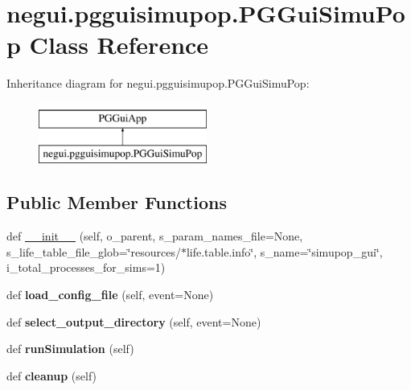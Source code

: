 \hypertarget{classnegui_1_1pgguisimupop_1_1PGGuiSimuPop}{}\section{negui.\+pgguisimupop.\+P\+G\+Gui\+Simu\+Pop Class Reference}
\label{classnegui_1_1pgguisimupop_1_1PGGuiSimuPop}
Inheritance diagram for negui.\+pgguisimupop.\+P\+G\+Gui\+Simu\+Pop\+:\begin{figure}[H]
\begin{center}
\leavevmode
\includegraphics[height=2.000000cm]{classnegui_1_1pgguisimupop_1_1PGGuiSimuPop}
\end{center}
\end{figure}
\subsection*{Public Member Functions}
\begin{DoxyCompactItemize}
\item 
def \hyperlink{classnegui_1_1pgguisimupop_1_1PGGuiSimuPop_aa159ead5d8fbd28d693c9021db12b95e}{\+\_\+\+\_\+init\+\_\+\+\_\+} (self, o\+\_\+parent, s\+\_\+param\+\_\+names\+\_\+file=None, s\+\_\+life\+\_\+table\+\_\+file\+\_\+glob=\char`\"{}resources/$\ast$life.\+table.\+info\char`\"{}, s\+\_\+name=\char`\"{}simupop\+\_\+gui\char`\"{}, i\+\_\+total\+\_\+processes\+\_\+for\+\_\+sims=1)
\item 
def {\bfseries load\+\_\+config\+\_\+file} (self, event=None)\hypertarget{classnegui_1_1pgguisimupop_1_1PGGuiSimuPop_a9ae755614518ece6584d83aff129f4d5}{}\label{classnegui_1_1pgguisimupop_1_1PGGuiSimuPop_a9ae755614518ece6584d83aff129f4d5}

\item 
def {\bfseries select\+\_\+output\+\_\+directory} (self, event=None)\hypertarget{classnegui_1_1pgguisimupop_1_1PGGuiSimuPop_a4d88e502ff12249698177dbb4336715d}{}\label{classnegui_1_1pgguisimupop_1_1PGGuiSimuPop_a4d88e502ff12249698177dbb4336715d}

\item 
def {\bfseries run\+Simulation} (self)\hypertarget{classnegui_1_1pgguisimupop_1_1PGGuiSimuPop_a7dc99019295f2a2650fa95ecddd55239}{}\label{classnegui_1_1pgguisimupop_1_1PGGuiSimuPop_a7dc99019295f2a2650fa95ecddd55239}

\item 
def {\bfseries cleanup} (self)\hypertarget{classnegui_1_1pgguisimupop_1_1PGGuiSimuPop_a24642a8bffa19a61a4fb1b6d5e9f0a1c}{}\label{classnegui_1_1pgguisimupop_1_1PGGuiSimuPop_a24642a8bffa19a61a4fb1b6d5e9f0a1c}

\end{DoxyCompactItemize}

